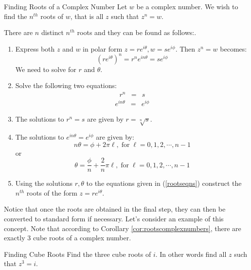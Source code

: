 \begin{procedure}{Finding Roots of a Complex Number}\label{proc:findingkthroots}
Let $w$ be a complex number. We wish to find the $n^{th}$ roots of $w$, that is all $z$ such that $z^n = w$. 

There are $n$ distinct $n^{th}$ roots and they can be found as follows:. 
 
\begin{enumerate}
\item Express both $z$ and $w$ in polar form $z=re^{i\theta}, w=se^{i\phi}$. Then $z^n = w$ becomes:
\[
(re^{i\theta})^n = r^n e^{i n \theta} = se^{i\phi}
\]
We need to solve for $r$ and $\theta$. 
\item Solve the following two equations:
\begin{eqnarray*}
r^n &=& s 
\end{eqnarray*}
\begin{eqnarray}
e^{i n \theta} &=& e^{i \phi}
\label{rootseqns}
\end{eqnarray}
\item The solutions to $r^n = s$ are given by $r = \sqrt[n]{s}$. 

\item The solutions to $e^{i n \theta} = e^{i \phi}$ are given by:
\[
n\theta = \phi + 2\pi \ell,  \; \mbox{for} \; \ell = 0,1,2, \cdots, n-1
\]
or
\[
\theta = \frac{\phi}{n} + \frac{2}{n} \pi \ell, \; \mbox{for} \; \ell = 0,1,2, \cdots, n-1 
\]
\item
Using the solutions $r, \theta$ to the equations given in (\ref{rootseqns})
construct the $n^{th}$ roots of the form $z = re^{i\theta}$.  
\end{enumerate}
\end{procedure}

Notice that once the roots are obtained in the final step, they can then be converted to standard form if necessary. Let's consider an example of this concept. Note that according to Corollary \ref{cor:rootscomplexnumbers}, 
there are exactly $3$ cube roots of a complex number.

\begin{example}{Finding Cube Roots}\label{exa:cuberoots}
Find the three cube roots of $i.$ In other words find all $z$ such that $z^3 = i$. 
\end{example}

